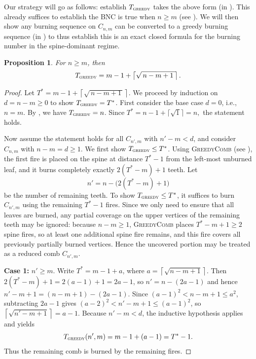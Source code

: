 \documentclass{article}
\newcommand{\gr}{\textsc{greedy}}
\newtheorem{proposition}{Proposition}
\begin{document}
Our strategy will go as follows: establish $T_\gr$ takes the above form (in ). This already suffices to establish the BNC is true when $n \ge m$ (see ). We will then show any burning sequence on $C_{n,m}$ can be converted to a greedy burning sequence (in ) to thus establish this is an exact closed formula for the burning number in the spine-dominant regime.

\begin{proposition}\label{prop: spine dom_greedy}
For $n \ge m$, then
\[
T_\gr = m-1 + \left\lceil \sqrt{\,n - m + 1\,}\right\rceil.
\]
\end{proposition}

\begin{proof}
Let $T^* = m-1 + \left\lceil \sqrt{\,n - m + 1\,}\right\rceil$. We proceed by induction on $d=n-m\ge0$ to show $T_\gr = T^*$. First consider the base case
$d=0$, i.e., $n=m$. By , we have $T_\gr=n$. Since $T^* =  n-1 + \lceil \sqrt{1} \rceil
= n,$ the statement holds.

Now assume the statement holds for all $C_{n',m}$ with $n'-m<d$, and consider
$C_{n,m}$ with $n-m=d\ge1$. We first show $T_\gr \le T^*$. Using \textsc{GreedyComb} (see ),
the first fire is placed on the spine at distance $T^*-1$ from the left-most
unburned leaf, and it burns completely exactly $2(T^*-m)+1$ teeth. Let
\[
n' = n - \bigl(2(T^*-m)+1\bigr)
\]
be the number of remaining teeth. To show $T_\gr \le T^*$, it suffices to burn $C_{n',m}$ using the remaining $T^*-1$ fires. Since we only need to ensure that all leaves are burned, any partial coverage on the upper vertices of the remaining teeth may be ignored: because $n-m \ge 1$, \textsc{GreedyComb} places $T^*-m+1 \ge 2$ spine fires, so at least one additional spine fire remains, and this fire covers all previously partially burned vertices. Hence the uncovered portion may be treated as a reduced comb $C_{n',m}$.


\smallskip
\textbf{Case 1:} $n'\ge m$.
Write $T^* = m-1 + a$, where
$a=\left\lceil \sqrt{n-m+1} \right\rceil$.
Then $2(T^*-m)+1 = 2(a-1)+1 = 2a-1$, so
$n' = n-(2a-1)$ and hence
$n'-m+1 = (n-m+1)-(2a-1)$.
Since $(a-1)^2 < n-m+1 \le a^2$, subtracting $2a-1$ gives
$(a-2)^2 < n'-m+1 \le (a-1)^2$,
so $\left\lceil \sqrt{n'-m+1} \right\rceil = a-1$.
Because $n'-m<d$, the inductive hypothesis applies and yields
\[
T_\gr({n',m})
=
m-1 + (a-1)
=
T^*-1.
\]
Thus the remaining comb is burned by the remaining fires.


\end{proof}
\end{document}

